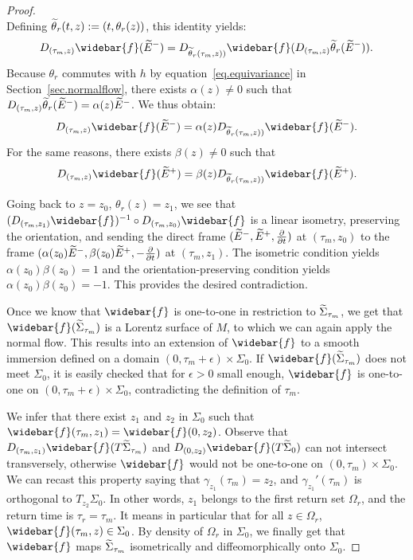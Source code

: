 \documentclass[11pt]{article}
\theoremstyle{definition}
\numberwithin{equation}{section}
\numberwithin{figure}{section}
\numberwithin{table}{section}
\newcommand{\ddt}{\frac{\partial}{\partial t}}
\let\oldtilde\tilde
\renewcommand*\tilde[1]{\mathchoice{\widetilde{#1}}{\widetilde{#1}}{\widetilde{#1}}{\oldtilde{#1}}}
\let\oldbar\bar
\renewcommand*{\bar}[1]{\mathchoice{\widebar{#1}}{\widebar{#1}}{\oldbar{#1}}{\oldbar{#1}}}
\renewcommand*{\overline}{\bar}
\begin{document}
\begin{proof}
\[\]
Defining $\tilde{\theta}_r(t,z):=(t,\theta_r(z))$, this identity yields:
\[
D_{(\tau_m,z)}{\overline{f}}(\tilde{E}^{-})=D_{\tilde{\theta}_r(\tau_m,z))}{\overline{f}}(D_{(\tau_m,z)}\tilde{\theta}_r(\tilde{E}^-)).
\]
Because $\theta_r$ commutes with $h$ by equation~\eqref{eq.equivariance} in Section~\ref{sec.normalflow}, there exists $\alpha(z) \not = 0$ such that $D_{(\tau_m,z)}\tilde{\theta}_r(\tilde{E}^-)=\alpha(z)\tilde{E}^-$. We thus obtain:
\[
D_{(\tau_m,z)}{\overline{f}}(\tilde{E}^{-})= \alpha(z) D_{\tilde{\theta}_r(\tau_m,z))}{\overline{f}}(\tilde{E}^-).
\]
For the same reasons, there exists $\beta(z) \not =0$ such that
\[
D_{(\tau_m,z)}{\overline{f}}(\tilde{E}^{+})= \beta(z) D_{\tilde{\theta}_r(\tau_m,z))}{\overline{f}}(\tilde{E}^+).
\]

Going back to $z=z_0$, $\theta_r(z)=z_1$, we see that $(D_{(\tau_m,z_1)}{\overline{f}})^{-1} \circ D_{(\tau_m,z_0)}{\overline{f}}$ is a linear isometry, preserving the orientation, and sending the direct frame $(\tilde{E}^-,\tilde{E}^+,\ddt)$ at $(\tau_m,z_0)$ to the frame $(\alpha(z_0) \tilde{E}^-, \beta(z_0) \tilde{E}^+,-\ddt)$ at $(\tau_m,z_1)$. The isometric condition yields $\alpha(z_0) \beta(z_0)=1$ and the orientation-preserving condition yields $ \alpha(z_0) \beta(z_0)=-1$. This provides the desired contradiction.


Once we know that ${\overline{f}}$ is one-to-one in restriction to $\tilde{\Sigma}_{\tau_m}$, we get that ${\overline{f}}(\tilde{\Sigma}_{\tau_m})$ is a Lorentz surface of $M$, to which we can again apply the normal flow. This results into an extension of ${\overline{f}}$ to a smooth immersion defined on a domain $(0,\tau_m+\epsilon) \times \Sigma_0$. If ${\overline{f}}(\tilde{\Sigma}_{\tau_m})$ does not meet $\Sigma_0$, it is easily checked that for $\epsilon>0$ small enough, ${\overline{f}}$ is one-to-one on $(0,\tau_m+\epsilon) \times \Sigma_0$, contradicting the definition of $\tau_m$.

We infer that there exist $z_1$ and $z_2$ in $\Sigma_0$ such that ${\overline{f}}(\tau_m,z_1)={\overline{f}}(0,z_2)$. Observe that $D_{(\tau_m,z_1)}{\overline{f}}(T\tilde{\Sigma}_{\tau_m})$ and $D_{(0,z_2)}{\overline{f}}(T \tilde{\Sigma}_0)$ can not intersect transversely, otherwise ${\overline{f}}$ would not be one-to-one on $(0,\tau_m) \times \Sigma_0$. We can recast this property saying that $\gamma_{z_1}(\tau_m)=z_2$, and $\gamma_{z_1}'(\tau_m)$ is orthogonal to $T_{z_2} \Sigma_0$. In other words, $z_1$ belongs to the first return set $\Omega_r$, and the return time is $\tau_r=\tau_m$. It means in particular that for all $z \in \Omega_r$, ${\overline{f}}(\tau_m,z) \in \Sigma_0$. By density of $\Omega_r$ in $\Sigma_0$, we finally get that ${\overline{f}}$ maps $\tilde{\Sigma}_{\tau_m}$ isometrically and diffeomorphically onto $\Sigma_0$.
\end{proof}
\end{document}
